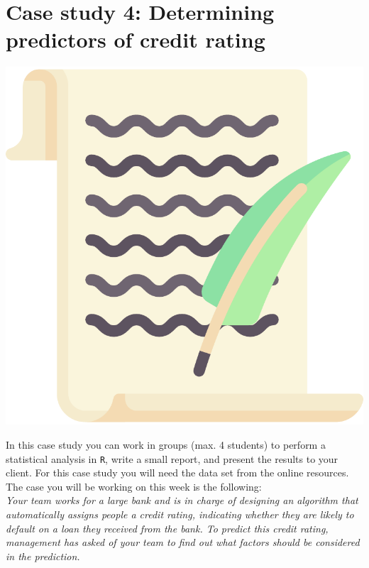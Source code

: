 
\begin{minipage}{0.8\textwidth}
\section{Case study 4: Determining predictors of credit rating}
\end{minipage}%
\hfill%
\begin{minipage}{0.1\textwidth}
\includegraphics[width=\linewidth]{Files/Images/lettericon.pdf}
\end{minipage}
\vspace*{.1cm}

In this case study you can work in groups (max. 4 students) to perform a statistical analysis in \texttt{R}, write a small report, and present the results to your client. For this case study you will need the data set  from the online resources. The case you will be working on this week is the following: \\

\textit{Your team works for a large bank and is in charge of designing an algorithm that automatically assigns people a credit rating, indicating whether they are likely to default on a loan they received from the bank. To predict this credit rating, management has asked of your team to find out what factors should be considered in the prediction.} \\

